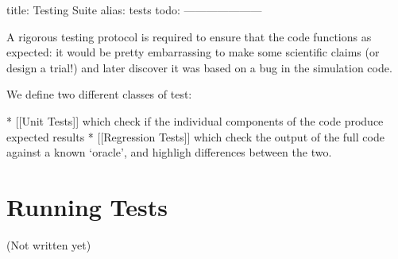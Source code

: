 title: Testing Suite
alias: tests
todo:
---------------------

A rigorous testing protocol is required to ensure that the code functions as expected: it would be pretty embarrassing to make some scientific claims (or design a trial!) and later discover it was based on a bug in the simulation code.

We define two different classes of test:

* [[Unit Tests]] which check if the individual components of the code produce expected results
	* [[Regression Tests]] which check the output of the full code against a known `oracle', and highligh differences between the two.

\section{Running Tests}
		(Not written yet)
